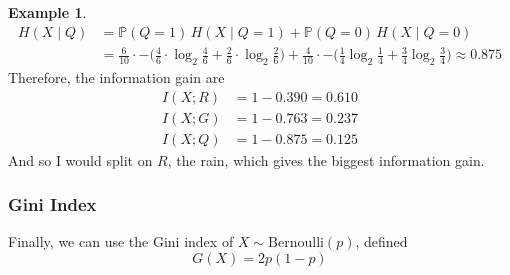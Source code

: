 \documentclass{article}
\theoremstyle{definition}
\newtheorem{example}{Example}[section]
\begin{document}
\begin{example}
\begin{align*}
      H(X \mid Q ) & = \mathbb{P}(Q = 1)\, H(X \mid Q = 1) + \mathbb{P}(Q = 0) \, H(X \mid Q = 0) \\
      & = \frac{6}{10} \cdot - \big( \frac{4}{6} \cdot \log_2 \frac{4}{6} + \frac{2}{6} \cdot \log_2 \frac{2}{6} \big) + \frac{4}{10} \cdot - \big( \frac{1}{4} \log_2 \frac{1}{4} + \frac{3}{4} \log_2 \frac{3}{4} \big) \approx 0.875
  \end{align*}
  Therefore, the information gain are 
  \begin{align*}
      I(X; R) & = 1 - 0.390 = 0.610 \\
      I(X; G) & = 1 - 0.763 = 0.237 \\
      I(X; Q) & = 1 - 0.875 = 0.125 
  \end{align*}
  And so I would split on $R$, the rain, which gives the biggest information gain. 
  \end{example}

  \subsubsection{Gini Index}

  Finally, we can use the Gini index of $X \sim \mathrm{Bernoulli}(p)$, defined 
  \[G(X) = 2 p (1 - p)\]
\end{document}
